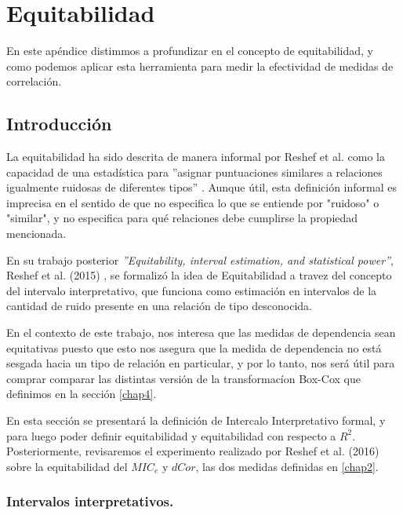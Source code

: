 \chapter{Equitabilidad}\label{appC}
	En este ap\'endice distimmos a profundizar en el concepto de equitabilidad, y como podemos aplicar esta herramienta para medir la efectividad de medidas de correlaci\'on.
	\section{Introducci\'on}

	La equitabilidad ha sido descrita de manera informal por Reshef et al. como la capacidad de una estad\'istica para ''asignar puntuaciones similares a relaciones igualmente ruidosas de diferentes tipos'' \cite{Reshef2011}. Aunque \'util, esta definici\'on informal es imprecisa en el sentido de que no especifica lo que se entiende por "ruidoso" o "similar", y no especifica para qu\'e relaciones debe cumplirse la propiedad mencionada.

	En su trabajo posterior \textit{''Equitability, interval estimation, and statistical power''}, Reshef et al. (2015) \cite{Reshef2015}, se formaliz\'o la idea de Equitabilidad a travez del concepto del intervalo interpretativo, que funciona como estimaci\'on en intervalos de la cantidad de ruido presente en una relaci\'on de tipo desconocida. 

	En el contexto de este trabajo, nos interesa que las medidas de dependencia sean equitativas puesto que esto nos asegura que la medida de dependencia no est\'a sesgada hacia un tipo de relaci\'on en particular, y por lo tanto, nos ser\'a \'util para comprar comparar las distintas versi\'on de la transformac\'ion Box-Cox que definimos en la secci\'on \ref{chap4}.

	En esta secci\'on se presentar\'a la definici\'on de Intercalo Interpretativo formal, y para luego poder definir equitabilidad y  equitabilidad con respecto a $R^2$. Posteriormente, revisaremos el experimento realizado por Reshef et al. (2016) \cite{Reshef2016} sobre la equitabilidad del $MIC_e$ y $dCor$, las dos medidas definidas en \ref{chap2}. 

	\subsection[equidefiniciones]{Intervalos interpretativos.}

